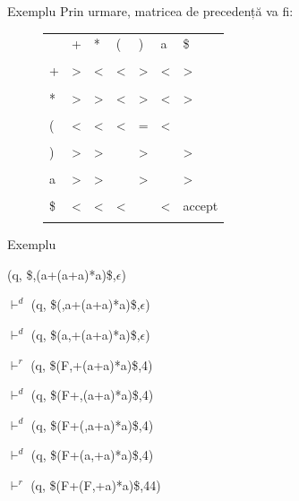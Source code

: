 \documentclass[pdf]{beamer}
\begin{document}
\begin{frame}{Exemplu}
Prin urmare, matricea de precedență va fi:
\newline

\begin{figure}[h]
\centering
\begin{tabular}{ | p{0.5cm} | p{0.5cm} | p{0.5cm} | p{0.5cm} | p{0.5cm} | p{0.5cm} | p{1cm} | }
\hline
	& +	& *		& (		& )		& a 	& \$  \\
	& & & & & & \\
\hline
	+& >	& <	& <	& >		& <	& >  \\
	& & & & & & \\
\hline
	*& >		& >	& <		& >		& < 	& >  \\
	& & & & & & \\
\hline
	(& <		& <		& <		& =		& < 	&   \\
	& & & & & & \\
\hline
	)& >		& >		& 		& >		&  	& >  \\
	& & & & & & \\
\hline
	a& >		& >	& 	& >		&  	& >  \\
	& & & & & & \\
\hline
	\$& <		&<	& <	& 	&  <	& accept  \\
	& & & & & & \\
\hline
\end{tabular}
\end{figure}
\end{frame}



\begin{frame}{Exemplu}

(q, \$,(a+(a+a)*a)\$,$\epsilon$)
\newline

$\vdash^{d}$ (q, \$(,a+(a+a)*a)\$,$\epsilon$) 
\newline

$\vdash^{d}$ (q, \$(a,+(a+a)*a)\$,$\epsilon$)  
\newline

$\vdash^{r}$ (q, \$(F,+(a+a)*a)\$,4)  
\newline

$\vdash^{d}$ (q, \$(F+,(a+a)*a)\$,4)  
\newline

$\vdash^{d}$ (q, \$(F+(,a+a)*a)\$,4)  
\newline

$\vdash^{d}$ (q, \$(F+(a,+a)*a)\$,4)  
\newline

$\vdash^{r}$ (q, \$(F+(F,+a)*a)\$,44)  

\end{frame}
\end{document}
